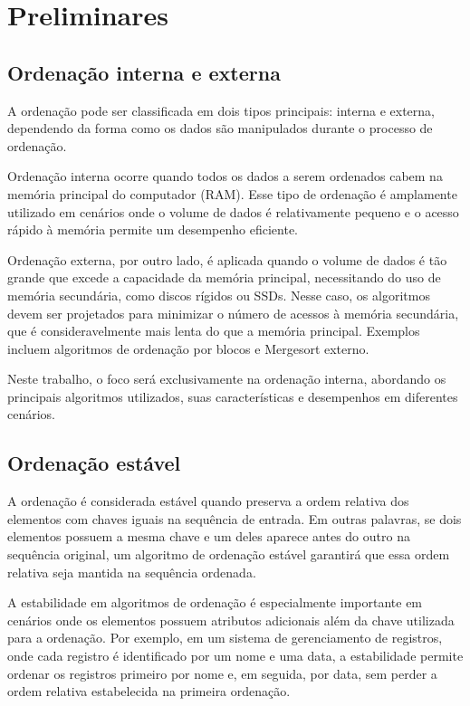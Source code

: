 \chapter{Preliminares}\label{cap:preliminares}
\section{Ordenação interna e externa}
A ordenação pode ser classificada em dois tipos principais: interna e externa, dependendo da forma como os dados são manipulados durante o processo de ordenação.

Ordenação interna ocorre quando todos os dados a serem ordenados cabem na memória principal do computador (RAM). Esse tipo de ordenação é amplamente utilizado em cenários onde o volume de dados é relativamente pequeno e o acesso rápido à memória permite um desempenho eficiente.

Ordenação externa, por outro lado, é aplicada quando o volume de dados é tão grande que excede a capacidade da memória principal, necessitando do uso de memória secundária, como discos rígidos ou SSDs. Nesse caso, os algoritmos devem ser projetados para minimizar o número de acessos à memória secundária, que é consideravelmente mais lenta do que a memória principal. Exemplos incluem algoritmos de ordenação por blocos e Mergesort externo.

Neste trabalho, o foco será exclusivamente na ordenação interna, abordando os principais algoritmos utilizados, suas características e desempenhos em diferentes cenários.

\section{Ordenação estável}
A ordenação é considerada estável quando preserva a ordem relativa dos elementos com chaves iguais na sequência de entrada. Em outras palavras, se dois elementos possuem a mesma chave e um deles aparece antes do outro na sequência original, um algoritmo de ordenação estável garantirá que essa ordem relativa seja mantida na sequência ordenada.

A estabilidade em algoritmos de ordenação é especialmente importante em cenários onde os elementos possuem atributos adicionais além da chave utilizada para a ordenação. Por exemplo, em um sistema de gerenciamento de registros, onde cada registro é identificado por um nome e uma data, a estabilidade permite ordenar os registros primeiro por nome e, em seguida, por data, sem perder a ordem relativa estabelecida na primeira ordenação.

